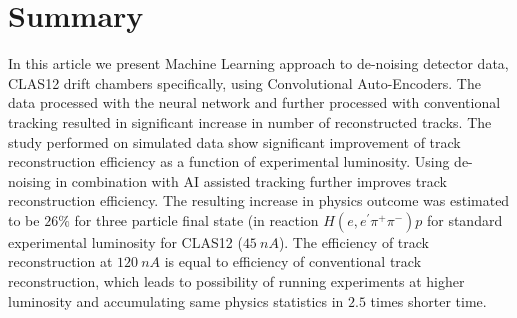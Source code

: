 

\section{Summary}

In this article we present Machine Learning approach to de-noising detector data, CLAS12 drift chambers specifically, using Convolutional Auto-Encoders. The data processed with the neural network and further processed with conventional tracking resulted in significant increase in number of reconstructed tracks. The study performed on simulated data show significant improvement of track reconstruction efficiency as a function of experimental luminosity. Using de-noising in combination with AI assisted tracking further improves track reconstruction efficiency. The resulting increase in physics outcome was estimated to be $26\%$ for three particle final state (in reaction $H(e,e^\prime\pi^+\pi^-)p$ for standard experimental luminosity for CLAS12 ($45~nA$). The efficiency of track reconstruction at $120~nA$ is equal to efficiency of conventional track reconstruction, which leads to possibility of running experiments at higher luminosity and accumulating same physics statistics in $2.5$ times shorter time.

